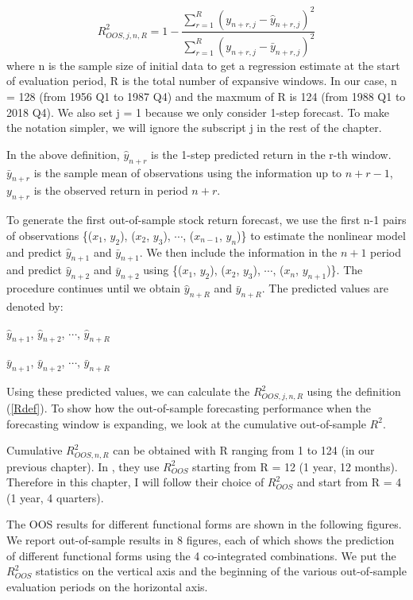 \documentclass[a4paper,12pt,times,numbered,print,index]{report}
\numberwithin{equation}{section}
\begin{document}
\begin{equation}
    R_{O O S, j, n, R}^{2}=1-\frac{\sum_{r=1}^{R}\left(y_{n+r, j}-\widehat{y}_{n+r, j}\right)^{2}}{\sum_{r=1}^{R}\left(y_{n+r, j}-\bar{y}_{n+r, j}\right)^{2}}
    \label{Rdef}
\end{equation}
where n is the sample size of initial data to get a regression estimate at the start of evaluation period, R is the total number of expansive windows. In our case, n = 128 (from 1956 Q1 to 1987 Q4) and the maxmum of R is 124 (from 1988 Q1 to 2018 Q4). We also set j = 1 because we only consider 1-step forecast. To make the notation simpler, we will ignore the subscript j in the rest of the chapter.  

In the above definition, $\hat{y}_{n+r}$ is the 1-step predicted return in the r-th window. $\bar{y}_{n+r}$ is the sample mean of observations using the information up to $n+r-1$,  $y_{n+r}$ is the observed return in period $n+r$. 

To generate the first out-of-sample stock return forecast, we use the first n-1 pairs of observations \{($x_1$, $y_2$), ($x_2$, $y_3$), $\cdots$, ($x_{n-1}$, $y_{n}$)\} to estimate the nonlinear model and predict $\hat{y}_{n+1}$ and $\bar{y}_{n+1}$. 
We then include the information in the $n+1$ period and predict $\hat{y}_{n+2}$ and $\bar{y}_{n+2}$ using \{($x_1$, $y_2$), ($x_2$, $y_3$), $\cdots$, ($x_{n}$, $y_{n+1}$)\}. 
The procedure continues until we obtain $\hat{y}_{n+R}$ and $\bar{y}_{n+R}$. The predicted values are denoted by:
\begin{center}
	$\hat{y}_{n+1}$, $\hat{y}_{n+2}$, $\cdots$, $\hat{y}_{n+R}$
	
	$\bar{y}_{n+1}$, $\bar{y}_{n+2}$, $\cdots$, $\bar{y}_{n+R}$
\end{center}

Using these predicted values, we can calculate the $R_{O O S, j, n, R}^{2}$ using the definition (\ref{Rdef}). To show how the out-of-sample forecasting performance when the forecasting window is expanding, we look at the cumulative out-of-sample $R^2$.

Cumulative $R_{O O S, n, R}^{2}$ can be obtained with R ranging from 1 to 124 (in our previous chapter). In \cite{cheng2019nonparametric}, they use $R^2_{OOS}$ starting from R = 12 (1 year, 12 months). Therefore in this chapter, I will follow their choice of $R^2_{OOS}$ and start from R = 4 (1 year, 4 quarters). 

The OOS results for different functional forms are shown in the following figures. We report out-of-sample results in
8 figures, each of which shows the prediction of different functional forms using the 4 co-integrated combinations. We put the $R^2_{OOS}$ statistics on the vertical axis and the beginning of the various out-of-sample evaluation periods on the horizontal axis. 
\end{document}
